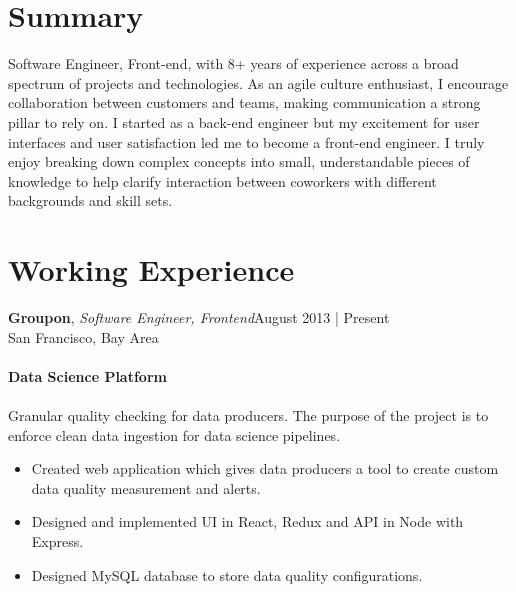 \documentclass[line,letterpaper, 10pt]{res}
\begin{document}
\address{jorgepvenegas@gmail.com.com \ \ \textbullet \ \ \ San Francisco, CA \ \ \textbullet \ \ \ jorgepvenegas.com}
\begin{resume}
	
	\section{Summary}
	Software Engineer, Front-end, with 8+ years of experience across a broad spectrum of projects and technologies. As an agile culture enthusiast, I encourage collaboration between customers and teams, making communication a strong pillar to rely on. I started as a back-end engineer but my excitement for user interfaces and user satisfaction led me to become a front-end engineer. I truly enjoy breaking down complex concepts into small, understandable pieces of knowledge to help clarify interaction between coworkers with different backgrounds and skill sets.

	\section{Working Experience}
	\textbf{Groupon}, {\sl Software Engineer, Frontend}\hfill August 2013 | Present
	\\ \hfill San Francisco, Bay Area
	\\ 
	\\ \textbf{Data Science Platform}
	\\
	\\Granular quality checking for data producers. The purpose of the project is to enforce clean data ingestion for data science pipelines.\\

	\begin{itemize} \itemsep 3pt
	\item Created web application which gives data producers a tool to create custom data quality measurement and alerts.
	\item Designed and implemented UI in React, Redux and API in Node with Express.
	\item Designed MySQL database to store data quality configurations.
	\end{itemize}


\end{resume}
\end{document}
